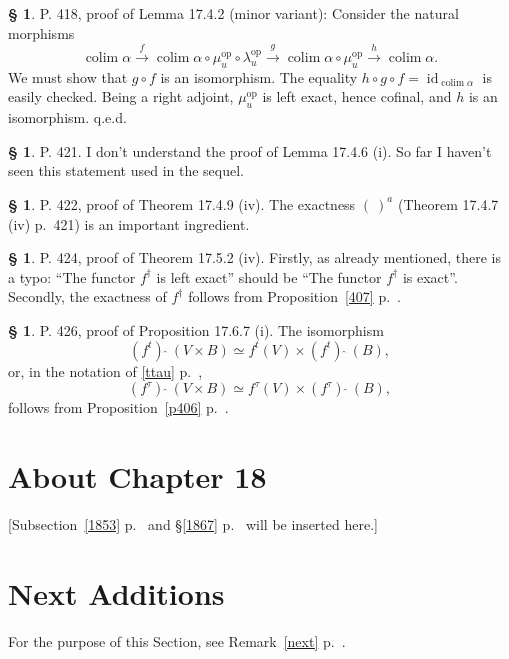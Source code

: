 \documentclass[12pt]{article}
\theoremstyle{remark}
\theoremstyle{definition}
\newtheorem{s}[thm]{\S}
\newcommand{\nn}{\noindent}
\newcommand{\xr}{\xrightarrow}
\newcommand{\mv}{ (minor variant)}
\DeclareMathOperator*{\co}{colim}
\DeclareMathOperator{\id}{id}
\DeclareMathOperator{\op}{op}
\begin{document}
%
%
\begin{s} 
P. 418, proof of Lemma 17.4.2\mv: Consider the natural morphisms 
$$
\co\alpha\xr f\co\alpha\circ\mu_u^{\op}\circ\lambda_u^{\op}\xr g\co\alpha\circ\mu_u^{\op}\xr h\co\alpha.
$$
We must show that $g\circ f$ is an isomorphism. The equality $h\circ g\circ f=\id_{\co\alpha}$ is easily checked. Being a right adjoint, $\mu_u^{\op}$ is left exact, hence cofinal, and $h$ is an isomorphism. q.e.d.
\end{s}
%
%
\begin{s} 
P. 421. I don't understand the proof of Lemma 17.4.6 (i). So far I haven't seen this statement used in the sequel.
\end{s}
%
%
\begin{s} 
P. 422, proof of Theorem 17.4.9 (iv). The exactness $(\ )^a$ (Theorem 17.4.7 (iv) p.~421) is an important ingredient.
\end{s}
%
%
\begin{s} 
P. 424, proof of Theorem 17.5.2 (iv). Firstly, as already mentioned, there is a typo: ``The functor $f^\dagger$ is left exact'' should be ``The functor $f^\dagger$ is exact''. Secondly, the exactness of $f^\dagger$ follows from Proposition~\ref{407} p.~\pageref{407}.
\end{s}
%
%
\begin{s} 
P. 426, proof of Proposition 17.6.7 (i). The isomorphism 
$$
(f^t)\ \widehat{}\ (V\times B)\simeq f^t(V)\times(f^t)\ \widehat{}\ (B),
$$ 
or, in the notation of \eqref{ttau} p.~\pageref{ttau}, 
$$
(f^\tau)\ \widehat{}\ (V\times B)\simeq f^\tau(V)\times(f^\tau)\ \widehat{}\ (B),
$$
follows from Proposition~\ref{p406} p.~\pageref{p406}. %
\end{s}
%
%
\section{About Chapter 18}
%
[Subsection~\ref{1853} p.~\pageref{1853} and \S\ref{1867} p.~\pageref{1867} will be inserted here.]
%
%
%
%
\newpage

\section{Next Additions}
%
For the purpose of this Section, see Remark~\ref{next} p.~\pageref{next}.
%
\end{document}
